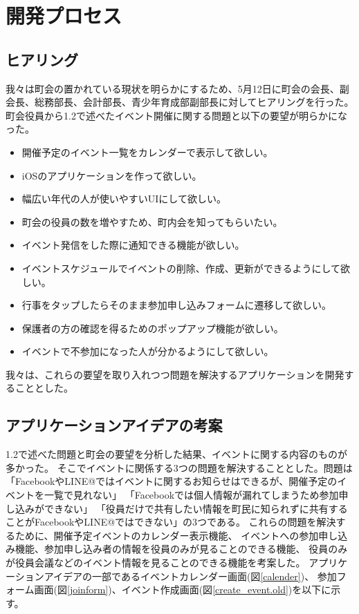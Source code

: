 \chapter{開発プロセス}

\section{ヒアリング}
我々は町会の置かれている現状を明らかにするため、5月12日に町会の会長、副会長、総務部長、会計部長、青少年育成部副部長に対してヒアリングを行った。
町会役員から1.2で述べたイベント開催に関する問題と以下の要望が明らかになった。

\begin{itemize}
\item 開催予定のイベント一覧をカレンダーで表示して欲しい。
\item iOSのアプリケーションを作って欲しい。
\item 幅広い年代の人が使いやすいUIにして欲しい。
\item 町会の役員の数を増やすため、町内会を知ってもらいたい。
\item イベント発信をした際に通知できる機能が欲しい。
\item イベントスケジュールでイベントの削除、作成、更新ができるようにして欲しい。
\item 行事をタップしたらそのまま参加申し込みフォームに遷移して欲しい。
\item 保護者の方の確認を得るためのポップアップ機能が欲しい。
\item イベントで不参加になった人が分かるようにして欲しい。
\end{itemize}

我々は、これらの要望を取り入れつつ問題を解決するアプリケーションを開発することとした。


\section{アプリケーションアイデアの考案}
1.2で述べた問題と町会の要望を分析した結果、イベントに関する内容のものが多かった。
そこでイベントに関係する3つの問題を解決することとした。問題は
「FacebookやLINE@ではイベントに関するお知らせはできるが、開催予定のイベントを一覧で見れない」
「Facebookでは個人情報が漏れてしまうため参加申し込みができない」
「役員だけで共有したい情報を町民に知られずに共有することがFacebookやLINE@ではできない」の3つである。
これらの問題を解決するために、開催予定イベントのカレンダー表示機能、
イベントへの参加申し込み機能、参加申し込み者の情報を役員のみが見ることのできる機能、
役員のみが役員会議などのイベント情報を見ることのできる機能を考案した。
アプリケーションアイデアの一部であるイベントカレンダー画面(図\ref{calender})、
参加フォーム画面(図\ref{joinform})、イベント作成画面(図\ref{create_event.old})を以下に示す。

